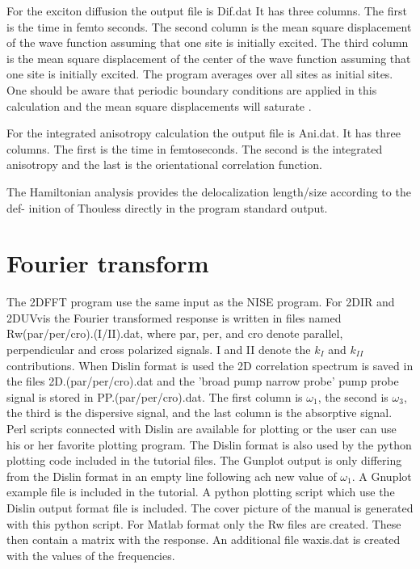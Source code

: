 For the exciton diffusion the output file is Dif.dat It has three columns. The first is the time in femto seconds. The second column is the mean square displacement of the wave function assuming that
one site is initially excited. The third column is the mean square displacement of the center of the 
wave function assuming that one site is initially excited. The program averages over all sites as
initial sites. One should be aware that periodic boundary conditions are applied in this calculation
and the mean square displacements will saturate \cite{Jansen.2010.JCP.132.224503}.

For the integrated anisotropy calculation the output file is Ani.dat. It has three columns. The first is the time in femtoseconds. The second is the integrated anisotropy and the last is the orientational correlation function.

The Hamiltonian analysis provides the delocalization length/size according to the def- 
inition of Thouless \cite{Thouless.1974.PR.13.93} directly in the program standard output. 

\section{Fourier transform \label{sec:Fourier}}
The 2DFFT program use the same input as the NISE program.
For 2DIR and 2DUVvis the Fourier transformed response is written in files named Rw(par/per/cro).(I/II).dat, where par, per, and cro denote parallel, perpendicular and cross polarized signals. I and II denote the $k_I$ and $k_{II}$ contributions. When Dislin format is used the 2D correlation spectrum is saved in the files 2D.(par/per/cro).dat and the 'broad pump narrow probe' pump probe signal is stored in PP.(par/per/cro).dat. 
The first column is $\omega_1$, the second is $\omega_3$, the third is the dispersive signal, and the
last column is the absorptive signal. Perl scripts connected with Dislin are available for plotting or the
user can use his or her favorite plotting program. The Dislin format is also used by the python plotting code included in the tutorial files.
The Gunplot output is only differing from the Dislin format in an empty line following ach new value of $\omega_1$. A Gnuplot example file is included in the tutorial. A python plotting script which use the Dislin output format file is included. The cover picture 
of the manual is generated with this python script.
 For Matlab format only the Rw files are created. These
then contain a matrix with the response. An additional file waxis.dat is created with the values of the
frequencies.

